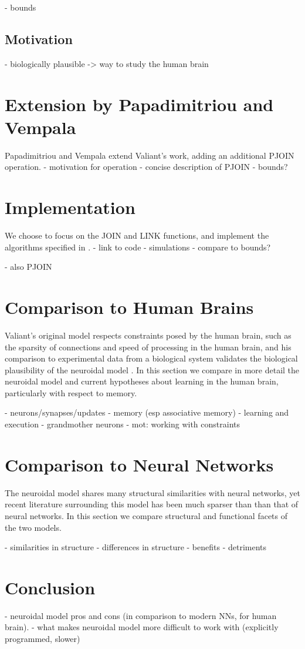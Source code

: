 \documentclass[letterpaper, 12pt]{article}
\begin{document}
- bounds
\subsection*{Motivation}
- biologically plausible -> way to study the human brain


\section{Extension by Papadimitriou and Vempala}
Papadimitriou and Vempala \cite{papadimitriou_cortical_2015} extend Valiant's work, adding an additional PJOIN operation.
- motivation for operation
- concise description of PJOIN
- bounds?

\section{Implementation}
We choose to focus on the JOIN and LINK functions, and implement the algorithms specified in \cite{valiant_memorization_2005}.
- link to code
- simulations
- compare to bounds?

- also PJOIN

\section{Comparison to Human Brains}
Valiant's original model respects constraints posed by the human brain, such as the sparsity of connections and speed of processing in the human brain, and his comparison to experimental data from a biological system validates the biological plausibility of the neuroidal model \cite{valiant_quantitative_2006}. In this section we compare in more detail the neuroidal model and current hypotheses about learning in the human brain, particularly with respect to memory.

- neurons/synapses/updates
- memory (esp associative memory)
- learning and execution
- grandmother neurons
- mot: working with constraints

\section{Comparison to Neural Networks}
The neuroidal model shares many structural similarities with neural networks, yet recent literature surrounding this model has been much sparser than than that of neural networks. In this section we compare structural and functional facets of the two models.

- similarities in structure
- differences in structure
- benefits
- detriments

\section{Conclusion}
- neuroidal model pros and cons (in comparison to modern NNs, for human brain).
- what makes neuroidal model more difficult to work with (explicitly programmed, slower)



\end{document}
